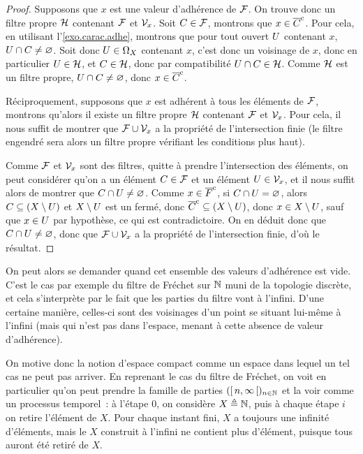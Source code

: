 \begin{proof}
  Supposons que $x$ est une valeur d'adhérence de $\mathcal{F}$. On trouve donc
  un filtre propre $\mathcal{H}$ contenant $\mathcal{F}$ et $\mathcal{V}_{x}$. Soit
  $C\in\mathcal{F}$, montrons que $x\in \overline{C}^{\mathrm c}$. Pour cela, en utilisant
  l'\cref{exo.carac.adhe}, montrons que pour tout ouvert $U$ contenant $x$,
  $U\cap C\neq\varnothing$. Soit donc $U\in \Omega_{X}$ contenant $x$,
  c'est donc un voisinage de $x$, donc en particulier
  $U\in\mathcal{H}$, et $C\in\mathcal{H}$, donc par compatibilité
  $U\cap C \in\mathcal{H}$. Comme $\mathcal{H}$ est un filtre propre,
  $U\cap C \neq \varnothing$, donc $x\in\overline{C}^{\mathrm c}$.

  Réciproquement, supposons que $x$ est adhérent à tous les éléments de
  $\mathcal{F}$, montrons qu'alors il existe un filtre propre $\mathcal{H}$
  contenant $\mathcal{F}$ et $\mathcal{V}_{x}$. Pour cela, il nous suffit de montrer que
  $\mathcal{F}\cup\mathcal{V}_{x}$ a la propriété de l'intersection finie (le filtre
  engendré sera alors un filtre propre vérifiant les conditions plus haut).

  Comme $\mathcal{F}$ et $\mathcal{V}_{x}$ sont des filtres, quitte à prendre
  l'intersection des éléments, on peut considérer qu'on a un élément
  $C\in\mathcal{F}$ et un élément $U\in\mathcal{V}_{x}$, et il nous suffit
  alors de montrer que $C\cap U \neq\varnothing$. Comme $x\in\overline{F}^{\mathrm c}$, si
  $C\cap U = \varnothing$, alors $C\subseteq (X\setminus U)$ et
  $X\setminus U$ est un fermé, donc
  $\overline{C}^{\mathrm c}\subseteq(X\setminus U)$, donc $x\in X\setminus U$,
  sauf que $x\in U$ par hypothèse, ce qui est contradictoire. On en déduit
  donc que $C\cap U \neq\varnothing$, donc que $\mathcal{F}\cup\mathcal{V}_{x}$ a la
  propriété de l'intersection finie, d'où le résultat.
\end{proof}

On peut alors se demander quand cet ensemble des valeurs d'adhérence est vide.
C'est le cas par exemple du filtre de Fréchet sur $\mathbb N$ muni de la
topologie discrète, et cela s'interprète par le fait que les parties du filtre
vont à l'infini. D'une certaine manière, celles-ci sont des voisinages d'un
point se situant lui-même à l'infini (mais qui n'est pas dans l'espace, menant
à cette absence de valeur d'adhérence).

On motive donc la notion d'espace compact comme un espace dans lequel un tel cas
ne peut pas arriver. En reprenant le cas du filtre de Fréchet, on voit en
particulier qu'on peut prendre la famille de parties
$(\mathord{\left[\,n,\infty\,\right[})_{n \in \mathbb N}$ et la voir comme un processus temporel~: à
l'étape $0$, on considère $X \triangleq \mathbb N$, puis à chaque étape $i$ on retire
l'élément de $X$. Pour chaque instant fini, $X$ a toujours une infinité
d'éléments, mais le $X$ construit \og à l'infini\fg{} ne contient plus
d'élément, puisque tous auront été retiré de $X$.

